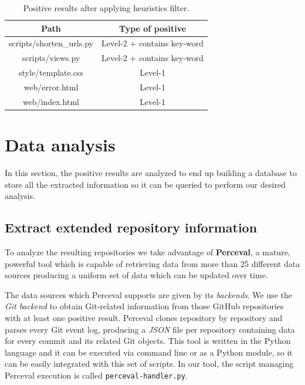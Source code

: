 \documentclass[a4paper, 12pt]{book}
\begin{document}
\begin{table}[]
\centering
\caption{Positive results after applying heuristics filter.}
\label{table:heuristics-positive-example}
\begin{tabular}{|c|c|}
\hline
\textbf{Path}              & \textbf{Type of positive}   \\ \hline
scripts/shorten\_urls.py & Level-2 + contains key-word   \\
scripts/views.py           & Level-2 + contains key-word \\
style/template.css         & Level-1                     \\
web/error.html             & Level-1                     \\
web/index.html             & Level-1                     \\ \hline
\end{tabular}
\end{table}
\section{Data analysis}
\label{sec:data-analysis}

In this section, the positive results are analyzed to end up building a database to store
all the extracted information so it can be queried to perform our desired analysis.

\subsection{Extract extended repository information}
\label{ssec:extract-perceval}
To analyze the resulting repositories we take advantage of \textbf{Perceval}, a mature, powerful tool which
is capable of retrieving data from more than 25 different data sources producing a uniform set of data which can be
updated over time.

The data sources which Perceval supports are given by its \emph{backends}. We use the \emph{Git backend} to obtain
Git-related information from those GitHub repositories with at least one positive result.
Perceval clones repository by repository and parses every Git event log, producing a \emph{JSON} file
per repository containing data for every commit and its related Git objects. This tool is written in the Python
language and it can be executed via command line or as a Python module, so it can be easily integrated with
this set of scripts. In our tool, the script managing Perceval execution is called \texttt{perceval-handler.py}.
\end{document}
